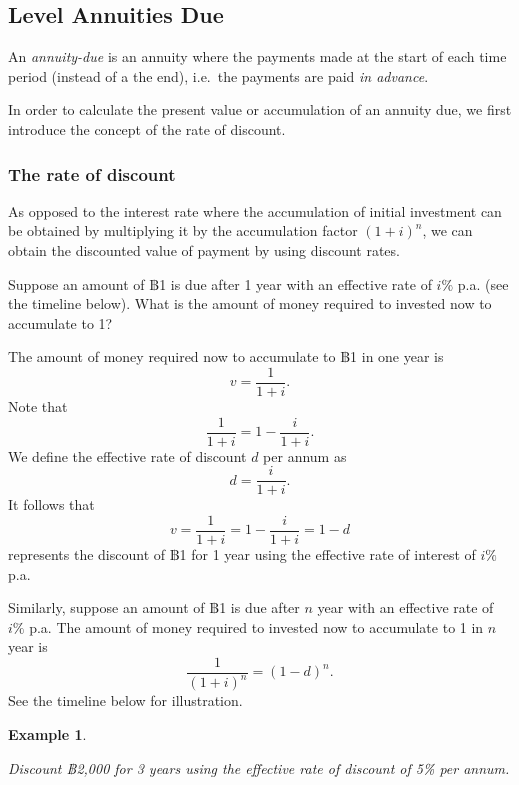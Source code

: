 \documentclass[landscape, 20pt]{extreport}
\theoremstyle{definition}
\theoremstyle{definition}
\newtheorem{example}{Example}[chapter]
\theoremstyle{definition}
\theoremstyle{definition}
\theoremstyle{remark}
\begin{document}
\hypertarget{level-annuities-due}{%
\subsection{Level Annuities Due}\label{level-annuities-due}}

An \emph{annuity-due} is an annuity where the payments made at the start of
each time period (instead of a the end), i.e.~the payments are paid \emph{in
advance}.

In order to calculate the present value or accumulation of an annuity
due, we first introduce the concept of the rate of discount.

\hypertarget{the-rate-of-discount}{%
\subsubsection*{The rate of discount}\label{the-rate-of-discount}}

As opposed to the interest rate where the accumulation of initial
investment can be obtained by multiplying it by the accumulation factor
\((1+i)^n\), we can obtain the discounted value of payment by using
discount rates.

Suppose an amount of ฿1 is due after 1 year with an effective rate of
\(i \%\) p.a. (see the timeline below). What is the amount of money
required to invested now to accumulate to 1?

The amount of money required now to accumulate to ฿1 in one year is
\[v =  \frac{1}{1+i}.\] Note that \[\frac{1}{1+i} = 1 - \frac{i}{1+i}.\]
We define the effective rate of discount \(d\) per annum
as\[d = \frac{i}{1+i}.\] It follows that
\[v = \frac{1}{1+i} = 1 - \frac{i}{1+i} =  1 - d\] represents the
discount of ฿1 for 1 year using the effective rate of interest of \(i \%\)
p.a.

Similarly, suppose an amount of ฿1 is due after \(n\) year with an
effective rate of \(i \%\) p.a. The amount of money required to invested
now to accumulate to 1 in \(n\) year is \[\frac{1}{(1+i)^n} = (1-d)^n.\]
See the timeline below for illustration.

\newpage \begin{example}
\protect\hypertarget{exm:unlabeled-div-21}{}\label{exm:unlabeled-div-21}

\emph{Discount ฿2,000 for 3 years using the effective rate
of discount of 5\% per annum.}

\end{example}
\end{document}
